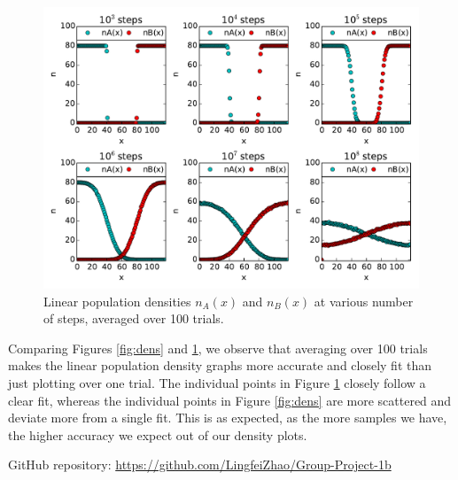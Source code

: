 \documentclass{article}
\begin{document}
\begin{figure}[H]
\centering
\includegraphics[width=12cm]{figures/GP1_3c.pdf}
\caption{Linear population densities $n_{A}(x)$ and $n_{B}(x)$ at various number of steps, averaged over 100 trials.}
\label{fig:avgdens}
\end{figure}

\noindent Comparing Figures \ref{fig:dens} and \ref{fig:avgdens}, we observe that averaging over 100 trials makes the linear population density graphs more accurate and closely fit than just plotting over one trial. The individual points in Figure \ref{fig:avgdens} closely follow a clear fit, whereas the individual points in Figure \ref{fig:dens} are more scattered and deviate more from a single fit. This is as expected, as the more samples we have, the higher accuracy we expect out of our density plots.\par
\bigskip
\noindent GitHub repository: \url{https://github.com/LingfeiZhao/Group-Project-1b}
\end{document}
